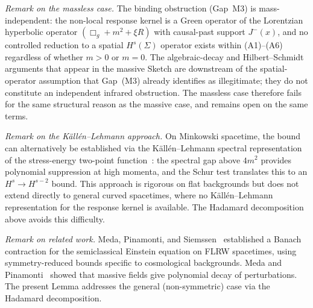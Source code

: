 \documentclass[12pt,a4paper]{article}
\begin{document}
\smallskip\noindent\textit{Remark on the massless case.} The binding
obstruction (Gap~M3) is mass-independent: the non-local response kernel is
a Green operator of the Lorentzian hyperbolic operator $(\Box_g + m^2 + \xi R)$
with causal-past support $J^-(x)$, and no controlled reduction to a spatial
$H^s(\Sigma)$ operator exists within (A1)--(A6) regardless of whether $m > 0$
or $m = 0$. The algebraic-decay and Hilbert--Schmidt arguments that appear in
the massive Sketch are downstream of the spatial-operator assumption that
Gap~(M3) already identifies as illegitimate; they do not constitute an
independent infrared obstruction. The massless case therefore fails for the
same structural reason as the massive case, and remains open on the same terms.

\smallskip\noindent\textit{Remark on the K\"all\'en--Lehmann approach.}
On Minkowski spacetime, the bound can alternatively be established via the
K\"all\'en--Lehmann spectral representation of the stress-energy two-point
function~\cite{phillips_hu,hu_verdaguer}: the spectral gap above $4m^2$
provides polynomial suppression at high momenta, and the Schur test
translates this to an $H^s\to H^{s-2}$ bound. This approach is rigorous on
flat backgrounds but does not extend directly to general curved spacetimes,
where no K\"all\'en--Lehmann representation for the response kernel is
available. The Hadamard decomposition above avoids this difficulty.

\smallskip\noindent\textit{Remark on related work.} Meda, Pinamonti, and
Siemssen~\cite{meda_pinamonti_siemssen} established a Banach contraction for the
semiclassical Einstein equation on FLRW spacetimes, using symmetry-reduced bounds
specific to cosmological backgrounds. Meda and Pinamonti~\cite{meda_pinamonti_stability}
showed that massive fields give polynomial decay of perturbations. The present Lemma
addresses the general (non-symmetric) case via the Hadamard decomposition.

\medskip
\end{document}
